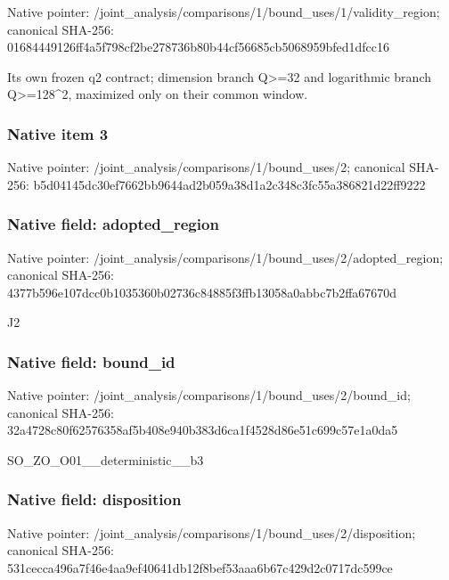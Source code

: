 \documentclass[10pt,a4paper]{article}
\begin{document}
Native pointer: /joint\_analysis/comparis\allowbreak{}ons/1/bound\_uses/1/valid\allowbreak{}ity\_region; canonical SHA-256: 01684449126ff4a5f798cf2b\allowbreak{}e278736b80b44cf56685cb50\allowbreak{}68959bfed1dfcc16


Its own frozen q2 contract; dimension branch Q>=32 and logarithmic branch Q>=128\textasciicircum{}2, maximized only on their common window.


\subsubsection{Native item 3}


Native pointer: /joint\_analysis/comparis\allowbreak{}ons/1/bound\_uses/2; canonical SHA-256: b5d04145dc30ef7662bb9644\allowbreak{}ad2b059a38d1a2c348c3fc55\allowbreak{}a386821d22ff9222



\subsubsection{Native field: adopted\_region}


Native pointer: /joint\_analysis/comparis\allowbreak{}ons/1/bound\_uses/2/adopt\allowbreak{}ed\_region; canonical SHA-256: 4377b596e107dcc0b1035360\allowbreak{}b02736c84885f3ffb13058a0\allowbreak{}abbc7b2ffa67670d


J2


\subsubsection{Native field: bound\_id}


Native pointer: /joint\_analysis/comparis\allowbreak{}ons/1/bound\_uses/2/bound\allowbreak{}\_id; canonical SHA-256: 32a4728c80f62576358af5b4\allowbreak{}08e940b383d6ca1f4528d86e\allowbreak{}51c699c57e1a0da5


SO\_ZO\_O01\_\_deterministic\_\_b3


\subsubsection{Native field: disposition}


Native pointer: /joint\_analysis/comparis\allowbreak{}ons/1/bound\_uses/2/dispo\allowbreak{}sition; canonical SHA-256: 531cecca496a7f46e4aa9ef4\allowbreak{}0641db12f8bef53aaa6b67c4\allowbreak{}29d2c0717dc599ce
\end{document}
